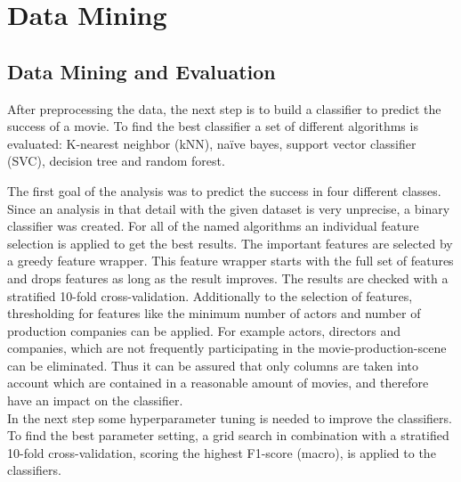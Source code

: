 \begingroup
\renewcommand{\clearpage}{}
\chapter{Data Mining}\label{cha:data_mining}
\endgroup

\section{Data Mining and Evaluation}
After preprocessing the data, the next step is to build a classifier to predict the success of a movie. To find the best classifier a set of different algorithms is evaluated:
K-nearest neighbor (kNN), 
na\"{i}ve bayes, 
support vector classifier (SVC), 
decision tree and 
random forest.


The first goal of the analysis was to predict the success in four different classes. Since an analysis in that detail with the given dataset is very unprecise, a binary classifier was created.
For all of the named algorithms an individual feature selection is applied to get the best results. The important features are selected by a greedy feature wrapper. This feature wrapper starts with the full set of features and drops features as long as the result improves. The results are checked with a stratified 10-fold cross-validation. Additionally to the selection of features, thresholding for features like the minimum number of actors and number of production companies can be applied. For example actors, directors and companies, which are not frequently participating in the movie-production-scene can be eliminated. Thus it can be assured that only columns are taken into account which are contained in a reasonable amount of movies, and therefore have an impact on the classifier. \\
In the next step some hyperparameter tuning is needed to improve the classifiers. To find the best parameter setting, a grid search in combination with a stratified 10-fold cross-validation, scoring the highest F1-score (macro), is applied to the classifiers.

